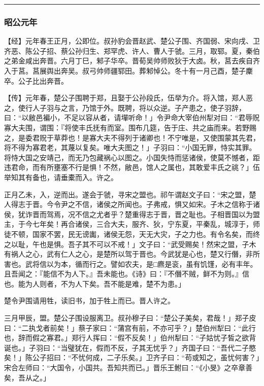 \documentclass[]{article}
\begin{document}
\begin{center}\rule{0.5\linewidth}{\linethickness}\end{center}

\hypertarget{header-n2354}{%
\subsubsection{昭公元年}\label{header-n2354}}

【经】元年春王正月，公即位。叔孙豹会晋赵武、楚公子围、齐国弱、宋向戌、卫齐恶、陈公子招、蔡公孙归生、郑罕虎、许人、曹人于虢。三月，取郓。夏，秦伯之弟金咸出奔晋。六月丁巳，邾子华卒。晋荀吴帅师败狄于大卤。秋，莒去疾自齐入于莒。莒展舆出奔吴。叔弓帅师疆郓田。葬邾悼公。冬十有一月己酉，楚子麇卒。公子比出奔晋。

【传】元年春，楚公子围聘于郑，且娶于公孙段氏，伍举为介。将入馆，郑人恶之，使行人子羽与之言，乃馆于外。既聘，将以众逆。子产患之，使子羽辞，曰：``以敝邑褊小，不足以容从者，请墠听命！」令尹命大宰伯州犁对曰：``君辱贶寡大夫围，谓围：『将使丰氏抚有而室。围布几筵，告于庄、共之庙而来。若野赐之，是委君贶于草莽也！是寡大夫不得列于诸卿也！不宁唯是，又使围蒙其先君，将不得为寡君老，其蔑以复矣。唯大夫图之！」子羽曰：``小国无罪，恃实其罪。将恃大国之安靖己，而无乃包藏祸心以图之。小国失恃而惩诸侯，使莫不憾者，距违君命，而有所壅塞不行是惧！不然，敝邑，馆人之属也，其敢爱丰氏之祧？」伍举知其有备也，请垂橐而入。许之。

正月乙未，入，逆而出。遂会于虢，寻宋之盟也。祁午谓赵文子曰：``宋之盟，楚人得志于晋。今令尹之不信，诸侯之所闻也。子弗戒，惧又如宋。子木之信称于诸侯，犹诈晋而驾焉，况不信之尤者乎？楚重得志于晋，晋之耻也。子相晋国以为盟主，于今七年矣！再合诸侯，三合大夫，服齐、狄，宁东夏，平秦乱，城淳于，师徒不顿，国家不罢，民无谤讟，诸侯无怨，天无大灾，子之力也。有令名矣，而终之以耻，午也是惧。吾子其不可以不戒！」文子曰：``武受赐矣！然宋之盟，子木有祸人之心，武有仁人之心，是楚所以驾于晋也。今武犹是心也，楚又行僭，非所害也。武将信以为本，循而行之。譬如农夫，是□麃是衮，虽有饥馑，必有丰年。且吾闻之：『能信不为人下。』吾未能也。《诗》曰：『不僭不贼，鲜不为则。』信也。能为人则者，不为人下矣。吾不能是难，楚不为患。」

楚令尹围请用牲，读旧书，加于牲上而已。晋人许之。

三月甲辰，盟。楚公子围设服离卫。叔孙穆子曰：``楚公子美矣，君哉！」郑子皮曰：``二执戈者前矣！」蔡子家曰：``蒲宫有前，不亦可乎？」楚伯州犁曰：``此行也，辞而假之寡君。」郑行人挥曰：``假不反矣！」伯州犁曰：``子姑忧子皙之欲背诞也。」子羽曰：``当璧犹在，假而不反，子其无忧乎？」齐国子曰：``吾代二子愍矣！」陈公子招曰：``不忧何成，二子乐矣。」卫齐子曰：``苟或知之，虽忧何害？」宋合左师曰：``大国令，小国共。吾知共而已。」晋乐王鲋曰：``《小旻》之卒章善矣，吾从之。」
\end{document}

